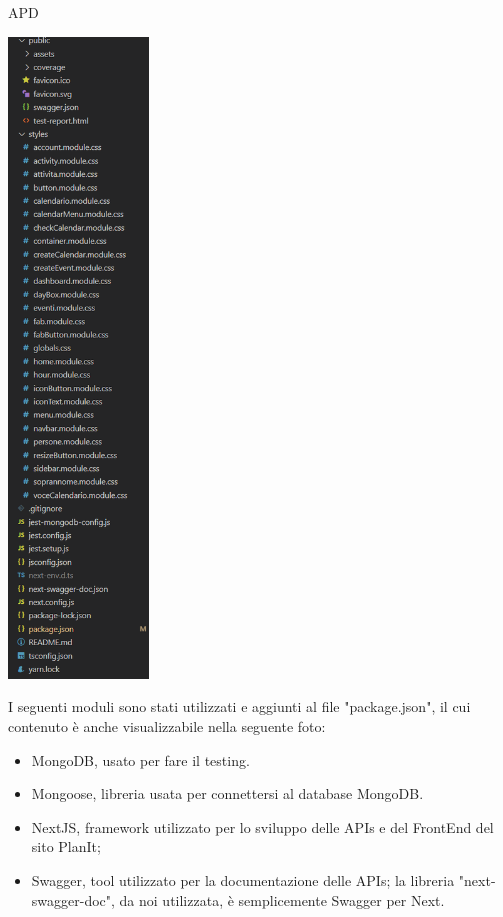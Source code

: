 \begin{listaPersonale} {APD}
\begin{center}
        \includegraphics[width=0.28\textwidth, height=0.75\textheight]{img/png/project_structure/project_structure_totale_2.png}
    \end{center}
    \newpage
    I seguenti moduli sono stati utilizzati e aggiunti al file "package.json", il cui contenuto è anche visualizzabile nella seguente foto:
    \begin{itemize}
        \item MongoDB, usato per fare il testing.
        \item Mongoose, libreria usata per connettersi al database MongoDB.
        \item NextJS, framework utilizzato per lo sviluppo delle APIs e del FrontEnd del sito PlanIt;
        \item Swagger, tool utilizzato per la documentazione delle APIs; la libreria "next-swagger-doc", da noi utilizzata, è semplicemente Swagger per Next.

\end{itemize}
\end{listaPersonale}
